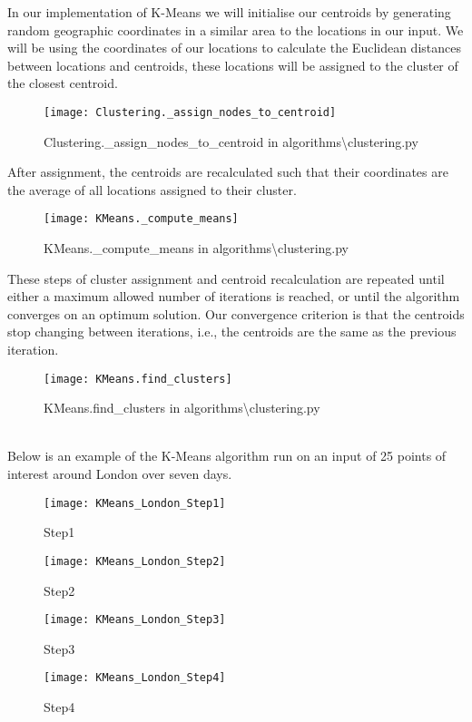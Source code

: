 \noindent
In our implementation of K-Means we will initialise our centroids by generating random geographic coordinates in
a similar area to the locations in our input.
We will be using the coordinates of our locations to calculate the Euclidean distances between locations and centroids,
these locations will be assigned to the cluster of the closest centroid.

\begin{figure}[H]\label{fig:_assign_nodes_to_centroid}
    \centering
    \texttt{[image: Clustering.\_assign\_nodes\_to\_centroid]}
    \caption{Clustering.\_assign\_nodes\_to\_centroid in algorithms\textbackslash clustering.py}
\end{figure}
\noindent
After assignment, the centroids are recalculated such that their coordinates are the average of all locations
assigned to their cluster.

\begin{figure}[H]\label{fig:_compute_means}
    \centering
    \texttt{[image: KMeans.\_compute\_means]}
    \caption{KMeans.\_compute\_means in algorithms\textbackslash clustering.py}
\end{figure}
\noindent
These steps of cluster assignment and centroid recalculation are repeated until either a maximum allowed number of
iterations is reached, or until the algorithm converges on an optimum solution.
Our convergence criterion is that the centroids stop changing between iterations, i.e., the centroids are the same
as the previous iteration.

\begin{figure}[H]\label{fig:find_clusters}
    \centering
    \texttt{[image: KMeans.find\_clusters]}
    \caption{KMeans.find\_clusters in algorithms\textbackslash clustering.py}
\end{figure}
\\
\noindent
Below is an example of the K-Means algorithm run on an input of 25 points of interest around London over seven days.

\begin{figure}[H]
    \ContinuedFloat*
    \texttt{[image: KMeans\_London\_Step1]}
    \caption{Step1}
\end{figure}
\begin{figure}[H]
    \ContinuedFloat
    \texttt{[image: KMeans\_London\_Step2]}
    \caption{Step2}
\end{figure}
\begin{figure}[H]
    \ContinuedFloat
    \texttt{[image: KMeans\_London\_Step3]}
    \caption{Step3}
\end{figure}
\begin{figure}[H]
    \ContinuedFloat
    \texttt{[image: KMeans\_London\_Step4]}
    \caption{Step4}
\end{figure}

